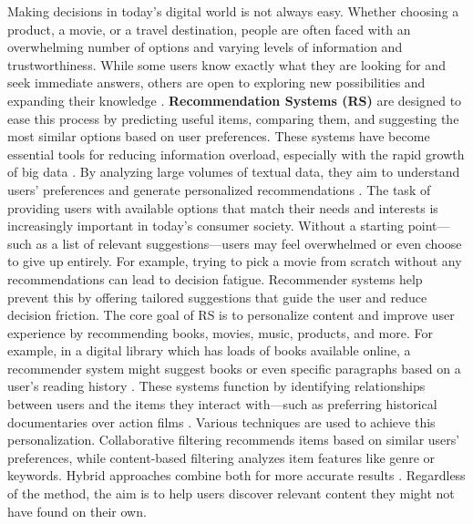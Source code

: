 \documentclass[conference]{IEEEtran}
\begin{document}
Making decisions in today’s digital world is not always easy. Whether choosing a product, a movie, or a travel destination, people are often faced with an overwhelming number of options and varying levels of information and trustworthiness. While some users know exactly what they are looking for and seek immediate answers, others are open to exploring new possibilities and expanding their knowledge \cite{Blanco201333}.
\textbf{Recommendation Systems (RS)} are designed to ease this process by predicting useful items, comparing them, and suggesting the most similar options based on user preferences. These systems have become essential tools for reducing information overload, especially with the rapid growth of big data \cite{Haruna2017}. By analyzing large volumes of textual data, they aim to understand users’ preferences and generate personalized recommendations \cite{Yan2024}.
The task of providing users with available options that match their needs and interests is increasingly important in today’s consumer society. Without a starting point—such as a list of relevant suggestions—users may feel overwhelmed or even choose to give up entirely. For example, trying to pick a movie from scratch without any recommendations can lead to decision fatigue. Recommender systems help prevent this by offering tailored suggestions that guide the user and reduce decision friction.
The core goal of RS is to personalize content and improve user experience by recommending books, movies, music, products, and more. For example, in a digital library which has loads of books available online, a recommender system might suggest books or even specific paragraphs based on a user’s reading history \cite{Zangerle2023}. These systems function by identifying relationships between users and the items they interact with—such as preferring historical documentaries over action films \cite{pub.1022525812}.
Various techniques are used to achieve this personalization. Collaborative filtering recommends items based on similar users’ preferences, while content-based filtering analyzes item features like genre or keywords. Hybrid approaches combine both for more accurate results \cite{Aymen2022896}. Regardless of the method, the aim is to help users discover relevant content they might not have found on their own.
\end{document}
